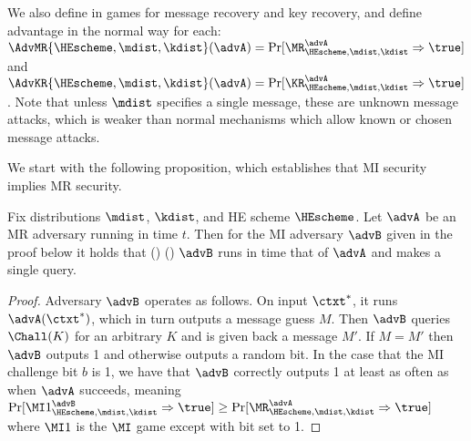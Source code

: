 We also define in  games for message recovery and 
key recovery, and define advantage in the normal way for each:
$\AdvMR{\HEscheme,\mdist,\kdist}(\advA) = \Pr[\MR_{\HEscheme,\mdist,\kdist}^\advA\Rightarrow \true]$
and 
$\AdvKR{\HEscheme,\mdist,\kdist}(\advA) = \Pr[\KR_{\HEscheme,\mdist,\kdist}^\advA\Rightarrow \true]$.
Note that unless $\mdist$ specifies a single message, these are unknown message 
attacks, which is weaker than normal mechanisms which allow known or chosen message attacks.


We start with the following proposition, which establishes that MI security
implies MR security. 

\begin{theorem}
Fix distributions $\mdist$, $\kdist$, and HE scheme $\HEscheme$. Let $\advA$ be an MR adversary
running in time $t$. Then for the MI adversary $\advB$ given in the proof below it holds that
\bnm
  \AdvMR{\HEscheme,\mdist,\kdist}(\advA) \cdotsm\AdvMI{\HEscheme,\mdist,\kdist}(\advB)
\enm
$\advB$ runs in time that of $\advA$ and makes a single query. 
\end{theorem}

\begin{proof}
Adversary $\advB$ operates as follows. On input $\ctxt^*$, it runs $\advA(\ctxt^*)$, which
in turn outputs a message guess $M$.  Then $\advB$ queries $\Chall(K)$ for an 
arbitrary $K$ and is given back a message $M'$. If $M = M'$ then $\advB$ outputs 1 and 
otherwise outputs a random bit. In the case that the MI challenge bit $b$ is 1, we
have that $\advB$ correctly outputs 1 at least as often as when $\advA$ succeeds, 
meaning $\Pr[\MI1_{\HEscheme,\mdist,\kdist}^\advB\Rightarrow \true] 
  \ge \Pr[\MR_{\HEscheme,\mdist,\kdist}^\advA\Rightarrow\true]$ 
where $\MI1$ is the  $\MI$ game except with bit set to 1. 

\end{proof}


